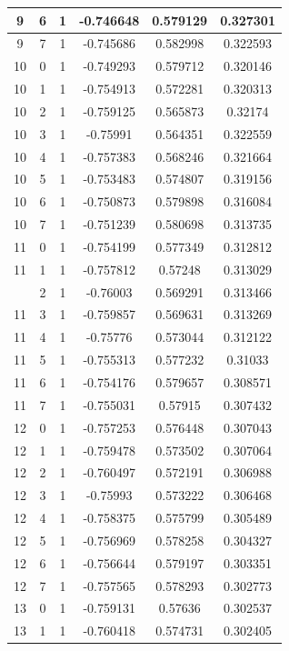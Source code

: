 \documentclass[12pt,a4paper]{article}
\numberwithin{equation}{section}
\numberwithin{figure}{section}
\numberwithin{table}{section}
\begin{document}
\begin{longtable}{|c|c|c|c|c|c|}
9 & 6 & 1 & -0.746648 & 0.579129 & 0.327301 \\ \hline
9 & 7 & 1 & -0.745686 & 0.582998 & 0.322593 \\ \hline
10 & 0 & 1 & -0.749293 & 0.579712 & 0.320146 \\ \hline
10 & 1 & 1 & -0.754913 & 0.572281 & 0.320313 \\ \hline
10 & 2 & 1 & -0.759125 & 0.565873 & 0.32174 \\ \hline
10 & 3 & 1 & -0.75991 & 0.564351 & 0.322559 \\ \hline
10 & 4 & 1 & -0.757383 & 0.568246 & 0.321664 \\ \hline
10 & 5 & 1 & -0.753483 & 0.574807 & 0.319156 \\ \hline
10 & 6 & 1 & -0.750873 & 0.579898 & 0.316084 \\ \hline
10 & 7 & 1 & -0.751239 & 0.580698 & 0.313735 \\ \hline
11 & 0 & 1 & -0.754199 & 0.577349 & 0.312812 \\ \hline
11 & 1 & 1 & -0.757812 & 0.57248 & 0.313029 \\ \hline
\pagebreak
11 & 2 & 1 & -0.76003 & 0.569291 & 0.313466 \\ \hline
11 & 3 & 1 & -0.759857 & 0.569631 & 0.313269 \\ \hline
11 & 4 & 1 & -0.75776 & 0.573044 & 0.312122 \\ \hline
11 & 5 & 1 & -0.755313 & 0.577232 & 0.31033 \\ \hline
11 & 6 & 1 & -0.754176 & 0.579657 & 0.308571 \\ \hline
11 & 7 & 1 & -0.755031 & 0.57915 & 0.307432 \\ \hline
12 & 0 & 1 & -0.757253 & 0.576448 & 0.307043 \\ \hline
12 & 1 & 1 & -0.759478 & 0.573502 & 0.307064 \\ \hline
12 & 2 & 1 & -0.760497 & 0.572191 & 0.306988 \\ \hline
12 & 3 & 1 & -0.75993 & 0.573222 & 0.306468 \\ \hline
12 & 4 & 1 & -0.758375 & 0.575799 & 0.305489 \\ \hline
12 & 5 & 1 & -0.756969 & 0.578258 & 0.304327 \\ \hline
12 & 6 & 1 & -0.756644 & 0.579197 & 0.303351 \\ \hline
12 & 7 & 1 & -0.757565 & 0.578293 & 0.302773 \\ \hline
13 & 0 & 1 & -0.759131 & 0.57636 & 0.302537 \\ \hline
13 & 1 & 1 & -0.760418 & 0.574731 & 0.302405 \\ \hline

\end{longtable}
\end{document}
